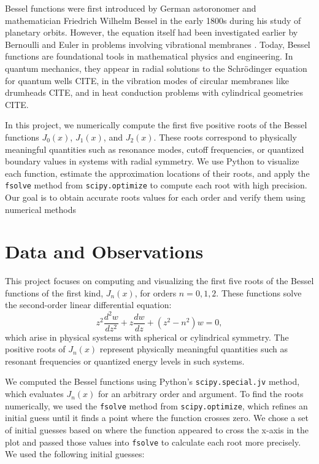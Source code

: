 \documentclass[linenumbers, twocolumn]{aastex631}
\begin{document}
\noindent Bessel functions were first introduced by German astoronomer and
mathematician Friedrich Wilhelm Bessel in the early 1800s during his study of
planetary orbits. However, the equation itself had been investigated earlier
by Bernoulli and Euler in problems involving vibrational membranes
\citet{abramowitz_stegun}. Today, Bessel functions are foundational tools in 
mathematical physics and engineering. In quantum mechanics, they appear in 
radial solutions to the Schrödinger equation for quantum wells CITE, in the 
vibration modes of circular membranes like drumheads CITE, and in heat 
conduction problems with cylindrical geometries CITE.

\noindent In this project, we numerically compute the first five positive roots
of the Bessel functions $J_0(x)$, $J_1(x)$, and $J_2(x)$. These roots correspond
to physically meaningful quantities such as resonance modes, cutoff frequencies, 
or quantized boundary values in systems with radial symmetry. We use Python to visualize each
function, estimate the approximation locations of their roots, and apply the \texttt{fsolve}
method from \texttt{scipy.optimize} to compute each root with high precision. 
Our goal is to obtain accurate roots values for each order and verify them 
using numerical methods


\section{Data and Observations} \label{sec:data}

This project focuses on computing and visualizing the first five roots of the
Bessel functions of the first kind, $J_n(x)$, for orders $n=0,1,2$. These
functions solve the second-order linear differential equation:
\begin{equation}
    z^2\frac{d^2 w}{dz^2}+z\frac{dw}{dz}+(z^2-n^2)w=0,
\end{equation}
\noindent which arise in physical systems with spherical or cylindrical 
symmetry. The positive roots of $J_n(x)$ represent physically meaningful
quantities such as resonant frequencies or quantized energy levels in such
systems.

\noindent We computed the Bessel functions using Python's \texttt{scipy.special.jv}
method, which evaluates $J_n(x)$ for an arbitrary order and argument. To
find the roots numerically, we used the \texttt{fsolve} method from \texttt{scipy.optimize},
which refines an initial guess until it finds a point where the function crosses
zero. We chose a set of initial guesses based on where the function appeared to
cross the x-axis in the plot and passed those values into \texttt{fsolve} to
calculate each root more precisely. We used the following initial guesses:
\end{document}
